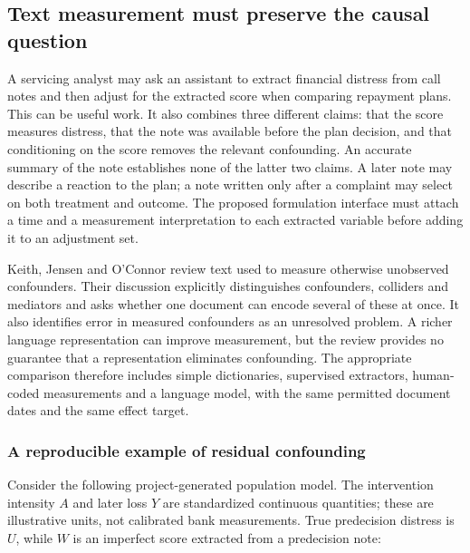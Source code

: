 \hypertarget{text-measurement-must-preserve-the-causal-question}{%
\subsection{Text measurement must preserve the causal
question}\label{text-measurement-must-preserve-the-causal-question}}

\label{exec13:census-measurement}

A servicing analyst may ask an assistant to extract financial distress
from call notes and then adjust for the extracted score when comparing
repayment plans. This can be useful work. It also combines three
different claims: that the score measures distress, that the note was
available before the plan decision, and that conditioning on the score
removes the relevant confounding. An accurate summary of the note
establishes none of the latter two claims. A later note may describe a
reaction to the plan; a note written only after a complaint may select
on both treatment and outcome. The proposed formulation interface must
attach a time and a measurement interpretation to each extracted
variable before adding it to an adjustment set.

Keith, Jensen and O'Connor review text used to measure otherwise
unobserved confounders. Their discussion explicitly distinguishes
confounders, colliders and mediators and asks whether one document can
encode several of these at once. It also identifies error in measured
confounders as an unresolved problem. A richer language representation
can improve measurement, but the review provides no guarantee that a
representation eliminates confounding. The appropriate comparison
therefore includes simple dictionaries, supervised extractors,
human-coded measurements and a language model, with the same permitted
document dates and the same effect target.
\cite{exec13_census_text_review_arxiv}

\hypertarget{a-reproducible-example-of-residual-confounding}{%
\subsubsection{A reproducible example of residual
confounding}\label{a-reproducible-example-of-residual-confounding}}

Consider the following project-generated population model. The
intervention intensity \(A\) and later loss \(Y\) are standardized
continuous quantities; these are illustrative units, not calibrated bank
measurements. True predecision distress is \(U\), while \(W\) is an
imperfect score extracted from a predecision note:


